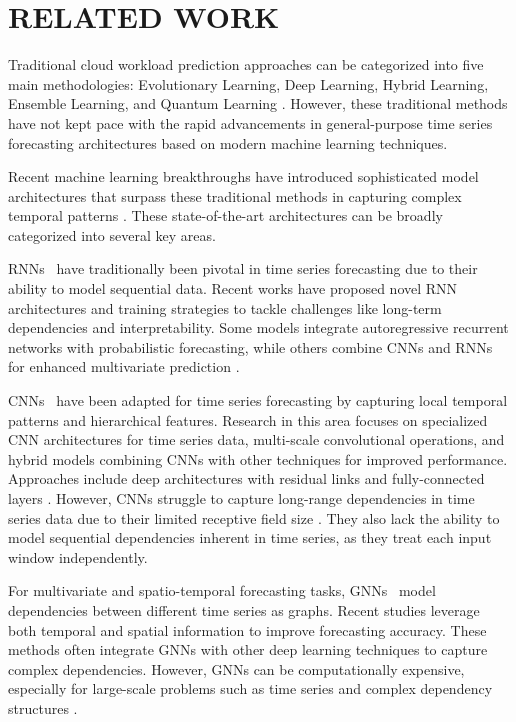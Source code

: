 \documentclass{ieeetmlcn}
\begin{document}
\section{RELATED WORK}
\label{sec:related_works}

Traditional cloud workload prediction approaches can be categorized into five main methodologies: Evolutionary Learning, Deep Learning, Hybrid Learning, Ensemble Learning, and Quantum Learning \cite{kumar2018workload, tang2019large}. However, these traditional methods have not kept pace with the rapid advancements in general-purpose time series forecasting architectures based on modern machine learning techniques.

Recent machine learning breakthroughs have introduced sophisticated model architectures that surpass these traditional methods in capturing complex temporal patterns \cite{acmtimeseriesreview2024}. These state-of-the-art architectures can be broadly categorized into several key areas.

RNNs~\cite{lai2018modelinglongshorttermtemporal, Jhin_2024, li2023learningpolarrepresentationextremeadaptive} have traditionally been pivotal in time series forecasting due to their ability to model sequential data. Recent works have proposed novel RNN architectures and training strategies to tackle challenges like long-term dependencies and interpretability. Some models integrate autoregressive recurrent networks with probabilistic forecasting, while others combine CNNs and RNNs for enhanced multivariate prediction \cite{li2024evogwp}.

CNNs~\cite{wang2023micn} have been adapted for time series forecasting by capturing local temporal patterns and hierarchical features. Research in this area focuses on specialized CNN architectures for time series data, multi-scale convolutional operations, and hybrid models combining CNNs with other techniques for improved performance. Approaches include deep architectures with residual links and fully-connected layers \cite{donghao2024moderntcn}. However, CNNs struggle to capture long-range dependencies in time series data due to their limited receptive field size \cite{wu2023timesnettemporal2dvariationmodeling}. They also lack the ability to model sequential dependencies inherent in time series, as they treat each input window independently.

For multivariate and spatio-temporal forecasting tasks, GNNs~\cite{yi2024fouriergnn, zhang2024irregular} model dependencies between different time series as graphs. Recent studies leverage both temporal and spatial information to improve forecasting accuracy. These methods often integrate GNNs with other deep learning techniques to capture complex dependencies. However, GNNs can be computationally expensive, especially for large-scale problems such as time series and complex dependency structures \cite{jin2024survey}.
\end{document}
